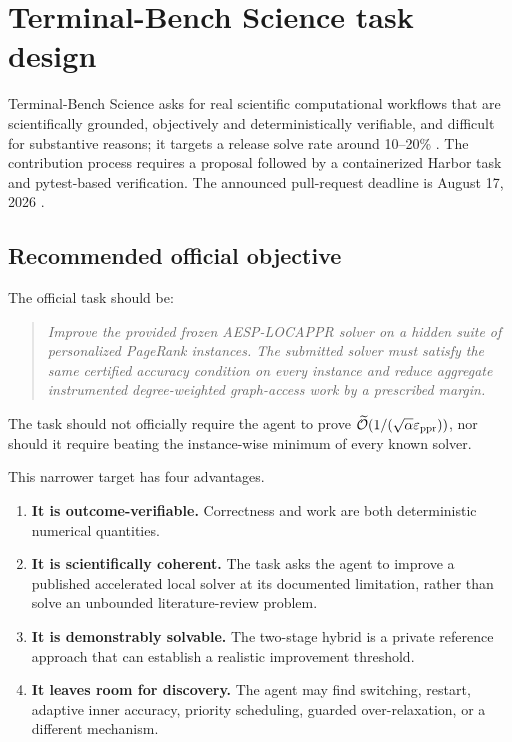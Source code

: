 \section{Terminal-Bench Science task design}
\label{sec:tbscience}

Terminal-Bench Science asks for real scientific computational workflows that
are scientifically grounded, objectively and deterministically verifiable,
and difficult for substantive reasons; it targets a release solve rate around
10--20\% \citep{tbscience2026announcement,tbscience2026rubric}.  The
contribution process requires a proposal followed by a containerized Harbor
task and pytest-based verification.  The announced pull-request deadline is
August 17, 2026 \citep{tbscience2026announcement}.

\subsection{Recommended official objective}

The official task should be:
\begin{quote}
\emph{Improve the provided frozen AESP-LOCAPPR solver on a hidden suite of
personalized PageRank instances.  The submitted solver must satisfy the same
certified accuracy condition on every instance and reduce aggregate
instrumented degree-weighted graph-access work by a prescribed margin.}
\end{quote}
The task should not officially require the agent to prove
\(\widetilde{\mathcal O}(1/(\sqrt\alpha\varepsilon_{\mathrm{ppr}}))\), nor should it require beating the
instance-wise minimum of every known solver.

This narrower target has four advantages.
\begin{enumerate}[leftmargin=2em]
\item \textbf{It is outcome-verifiable.}  Correctness and work are both
      deterministic numerical quantities.
\item \textbf{It is scientifically coherent.}  The task asks the agent to
      improve a published accelerated local solver at its documented
      limitation, rather than solve an unbounded literature-review problem.
\item \textbf{It is demonstrably solvable.}  The two-stage hybrid is a private
      reference approach that can establish a realistic improvement threshold.
\item \textbf{It leaves room for discovery.}  The agent may find switching,
      restart, adaptive inner accuracy, priority scheduling, guarded
      over-relaxation, or a different mechanism.
\end{enumerate}

